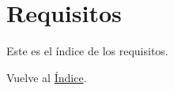 \newpage
\section{Requisitos}
Este es el índice de los requisitos.

Vuelve al \hyperlink{toc}{Índice}.
